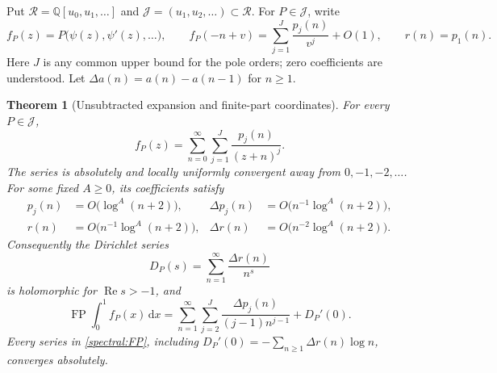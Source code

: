 \documentclass[11pt,a4paper]{article}
\numberwithin{equation}{section}
\newtheorem{theorem}{Theorem}[section]
\theoremstyle{definition}
\theoremstyle{remark}
\DeclareMathOperator{\FP}{FP}
\newcommand{\re}{\operatorname{Re}}
\newcommand{\dd}{\,\mathrm d}
\newcommand{\Q}{\mathbb Q}
\begin{document}
Put $\mathcal R=\Q[u_0,u_1,\ldots]$ and
$\mathcal J=(u_1,u_2,\ldots)\subset\mathcal R$.  For $P\in\mathcal J$,
write
\[
 f_P(z)=P\bigl(\psi(z),\psi'(z),\ldots\bigr),\qquad
 f_P(-n+v)=\sum_{j=1}^{J}\frac{p_j(n)}{v^j}+O(1),
 \qquad r(n)=p_1(n).
\]
Here $J$ is any common upper bound for the pole orders; zero coefficients
are understood.  Let $\Delta a(n)=a(n)-a(n-1)$ for $n\geq1$.

\begin{theorem}[Unsubtracted expansion and finite-part coordinates]
\label{spectral:ML}
For every $P\in\mathcal J$,
\begin{equation}\label{spectral:MLseries}
 \boxed{\displaystyle
 f_P(z)=\sum_{n=0}^{\infty}\sum_{j=1}^{J}
                    \frac{p_j(n)}{(z+n)^j}.}
\end{equation}
The series is absolutely and locally uniformly convergent away from
$0,-1,-2,\ldots$.  For some fixed $A\geq0$, its coefficients satisfy
\begin{align}
 p_j(n)&=O\bigl(\log^A(n+2)\bigr),&
 \Delta p_j(n)&=O\bigl(n^{-1}\log^A(n+2)\bigr),\label{spectral:pest}\\
 r(n)&=O\bigl(n^{-1}\log^A(n+2)\bigr),&
 \Delta r(n)&=O\bigl(n^{-2}\log^A(n+2)\bigr).
 \label{spectral:rest}
\end{align}
Consequently the Dirichlet series
\begin{equation}\label{spectral:DP}
 D_P(s)=\sum_{n=1}^{\infty}\frac{\Delta r(n)}{n^s}
\end{equation}
is holomorphic for $\re s>-1$, and
\begin{equation}\label{spectral:FP}
 \boxed{\displaystyle
 \FP\int_0^1 f_P(x)\dd x
 =\sum_{n=1}^{\infty}\sum_{j=2}^{J}
       \frac{\Delta p_j(n)}{(j-1)n^{j-1}}+D_P'(0).}
\end{equation}
Every series in \eqref{spectral:FP}, including
$D_P'(0)=-\sum_{n\geq1}\Delta r(n)\log n$, converges absolutely.
\end{theorem}
\end{document}
